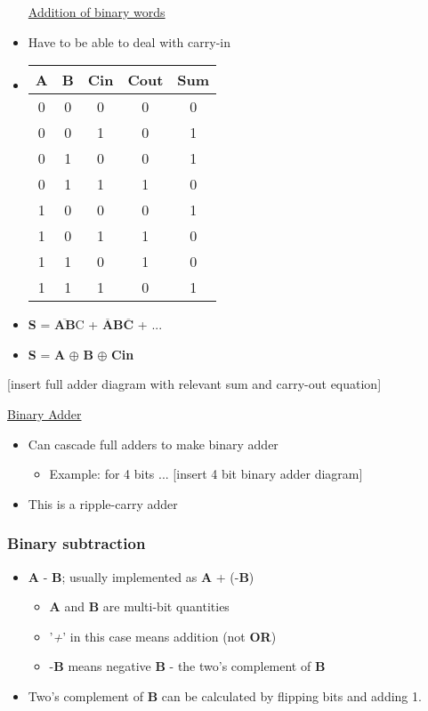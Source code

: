 \documentclass{article}
\begin{document}
\begin{itemize}
\underline{Addition of binary words}

\item Have to be able to deal with carry-in
\item 
\begin{tabular}{ c c c c c }
A & B & Cin & Cout & Sum \\ 
\hline
 0 & 0 & 0 & 0 & 0 \\  
 0 & 0 & 1 & 0 & 1 \\  
 0 & 1 & 0 & 0 & 1 \\  
 0 & 1 & 1 & 1 & 0 \\  
 1 & 0 & 0 & 0 & 1 \\  
 1 & 0 & 1 & 1 & 0 \\   
 1 & 1 & 0 & 1 & 0 \\  
 1 & 1 & 1 & 0 & 1 \\   
\end{tabular}
\item \textbf{S} = $\overline{\textbf{AB}}$C + $\overline{\textbf{A}}$\textbf{B}$\overline{\textbf{C}}$ + ...
\item \textbf{S} = \textbf{A} $\oplus$ \textbf{B} $\oplus$ \textbf{Cin}
\end{itemize}


[insert full adder diagram with relevant sum and carry-out equation]

\underline{Binary Adder}
\begin{itemize}
\item Can cascade full adders to make binary adder
\begin{itemize}
\item Example: for 4 bits ...
[insert 4 bit binary adder diagram]
\end{itemize}
\item This is a ripple-carry adder
\end{itemize}

\subsubsection{Binary subtraction}
\begin{itemize}
\item \textbf{A} - \textbf{B}; usually implemented as \textbf{A} + (-\textbf{B})
\begin{itemize}
\item \textbf{A} and \textbf{B} are multi-bit quantities
\item '\textit{+}' in this case means addition (not \textbf{OR})
\item -\textbf{B} means negative \textbf{B} - the two's complement of \textbf{B}
\end{itemize}
\item Two's complement of \textbf{B} can be calculated by flipping bits and adding 1.
\end{itemize}
\end{document}
